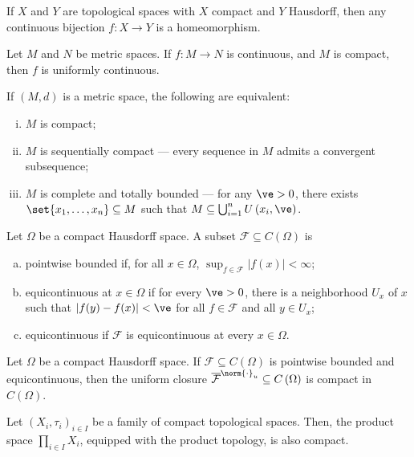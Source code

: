 \begin{fact}
  If $X$ and $Y$ are topological spaces with $X$ compact and $Y$ Hausdorff, then any continuous bijection $f\colon X\rightarrow Y$ is a homeomorphism.
\end{fact}
\begin{fact}
  Let $M$ and $N$ be metric spaces. If $f\colon M\rightarrow N$ is continuous, and $M$ is compact, then $f$ is uniformly continuous.
\end{fact}
\begin{fact}
  If $\left(M,d\right)$ is a metric space, the following are equivalent:
  \begin{enumerate}[(i)]
    \item $M$ is compact;
    \item $M$ is sequentially compact --- every sequence in $M$ admits a convergent subsequence;
    \item $M$ is complete and totally bounded --- for any $\ve > 0$, there exists $\set{x_1,\dots,x_n}\subseteq M$ such that $M\subseteq \bigcup_{i=1}^{n}U\left(x_i,\ve\right)$.
  \end{enumerate}
\end{fact}
\begin{definition}
  Let $\Omega$ be a compact Hausdorff space. A subset $\mathcal{F}\subseteq C\left(\Omega\right)$ is
  \begin{enumerate}[(a)]
    \item pointwise bounded if, for all $x\in \Omega$, $\sup_{f\in \mathcal{F}}\left\vert f(x) \right\vert < \infty$;
    \item equicontinuous at $x\in \Omega$ if for every $\ve > 0$, there is a neighborhood $U_x$ of $x$ such that $\left\vert f(y) - f(x) \right\vert < \ve$ for all $f\in \mathcal{F}$ and all $y\in U_x$;
    \item equicontinuous if $\mathcal{F}$ is equicontinuous at every $x\in \Omega$.
  \end{enumerate}
\end{definition}
\begin{theorem}
  Let $\Omega$ be a compact Hausdorff space. If $\mathcal{F}\subseteq C\left(\Omega\right)$ is pointwise bounded and equicontinuous, then the uniform closure $\overline{\mathcal{F}}^{\norm{\cdot}_u}\subseteq C\left(\Omega\right)$ is compact in $C\left(\Omega\right)$.
\end{theorem}
\begin{theorem}
  Let $\left(X_i,\tau_i\right)_{i\in I}$ be a family of compact topological spaces. Then, the product space $\prod_{i\in I}X_i$, equipped with the product topology, is also compact.
\end{theorem}
